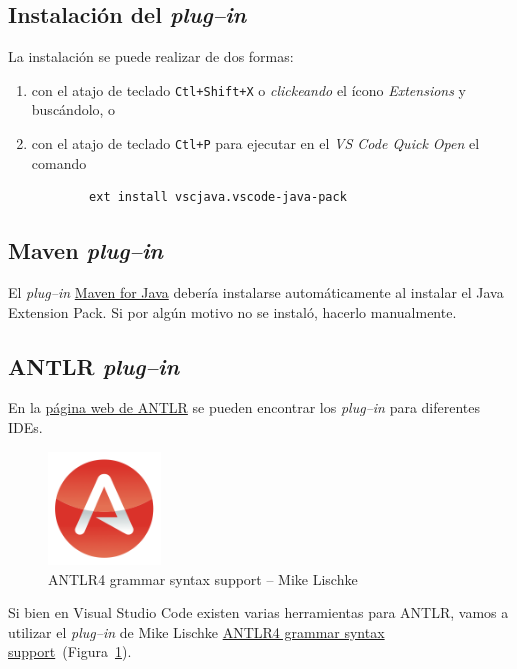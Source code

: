 \subsection*{Instalación del \emph{plug--in}}
\label{instalacionJava}

La instalación se puede realizar de dos formas:
\begin{enumerate}
	\item con el atajo de teclado \verb|Ctl+Shift+X| o \emph{clickeando} el ícono \emph{Extensions} y buscándolo, o
    \item con el atajo de teclado \verb|Ctl+P| para ejecutar en el \emph{VS Code Quick Open} el comando
    \begin{verbatim}
		ext install vscjava.vscode-java-pack
	\end{verbatim}
\end{enumerate}


\subsection{Maven \emph{plug--in}}
\label{pluginMaven}

El \emph{plug--in} \href{https://marketplace.visualstudio.com/items?itemName=vscjava.vscode-maven}{Maven for Java} debería instalarse automáticamente al instalar el Java Extension Pack.  Si por algún motivo no se instaló, hacerlo manualmente.


\subsection{ANTLR \emph{plug--in}}
\label{pluginANTLR}

En la \href{https://www.antlr.org/tools.html}{página web de ANTLR} se pueden encontrar los \emph{plug--in} para diferentes IDEs.

\begin{figure}[b]
	\centering
	\includegraphics[width=3cm]{img/IconoANTLRvscode}
	\caption{ANTLR4 grammar syntax support -- Mike Lischke}
	\label{icono}
\end{figure}

Si bien en Visual Studio Code existen varias herramientas para ANTLR, vamos a utilizar el \emph{plug--in} de Mike Lischke \href{https://marketplace.visualstudio.com/items?itemName=mike-lischke.vscode-antlr4}{ANTLR4 grammar syntax support}~(Figura~\ref{icono}).

